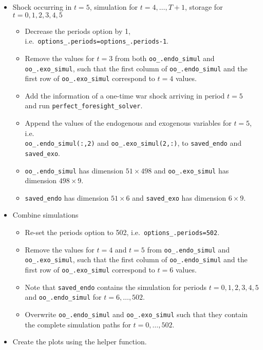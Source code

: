 \documentclass[a4paper]{scrartcl}
\begin{document}
\begin{enumerate}
\begin{itemize}
  \item
  Shock occurring in \(t=5\), simulation for \(t=4,\ldots ,T+1\), storage for \(t=0,1,2,3,4,5\)
  \begin{itemize}
    \item
    Decrease the periods option by 1, i.e.\ \texttt{options{\_}.periods=options{\_}.periods-1}.
    \item
    Remove the values for \(t=3\) from both \texttt{oo{\_}.endo{\_}simul} and \texttt{oo{\_}.exo\_simul},
      such that the first column of \texttt{oo{\_}.endo{\_}simul}
      and the first row of \texttt{oo{\_}.exo{\_}simul} correspond to \(t=4\) values.
    \item
    Add the information of a one-time war shock arriving in period \(t=5\) \\
      and run \texttt{perfect{\_}foresight{\_}solver}.
    \item
    Append the values of the endogenous and exogenous variables for \(t=5\), i.e.\\
      \texttt{oo{\_}.endo{\_}simul{(:,2)}} and \texttt{oo{\_}.exo{\_}simul{(2,:)}},
      to \texttt{saved{\_}endo} and \texttt{saved{\_}exo}.
    \item
    \texttt{oo{\_}.endo{\_}simul} has dimension \(51 \times 498\) and
    \texttt{oo{\_}.exo{\_}simul} has dimension \(498 \times 9\).
    \item
    \texttt{saved{\_}endo} has dimension \(51 \times 6\) and
    \texttt{saved{\_}exo} has dimension \(6 \times 9\).
  \end{itemize}

  \item
  Combine simulations
  \begin{itemize}
    \item
    Re-set the periods option to 502, i.e.\ \texttt{options{\_}.periods=502}.
    \item
    Remove the values for \(t=4\) and \(t=5\) from \texttt{oo{\_}.endo{\_}simul} and \texttt{oo{\_}.exo{\_}simul},
      such that the first column of \texttt{oo{\_}.endo{\_}simul}
      and the first row of \texttt{oo{\_}.exo{\_}simul} correspond to \(t=6\) values.
    \item
    Note that \texttt{saved{\_}endo} contains the simulation for periods \(t=0,1,2,3,4,5\) \\
      and \texttt{oo{\_}.endo{\_}simul} for \(t=6,\ldots ,502\).
    \item
    Overwrite \texttt{oo{\_}.endo{\_}simul} and \texttt{oo{\_}.exo{\_}simul}
      such that they contain the complete simulation paths for \(t=0,\ldots ,502\).
  \end{itemize}

  \item
  Create the plots using the helper function.
    
\end{itemize}

\end{enumerate}
\end{document}
